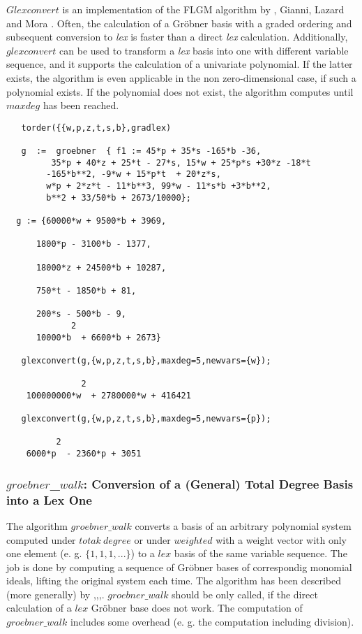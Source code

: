 $Glexconvert$ is an implementation of the FLGM algorithm by
, {\sc Gianni}, {\sc Lazard} and {\sc
Mora} \cite{Faugere:89}. Often, the calculation of a Gr\"obner basis
with a graded ordering and subsequent conversion to {\it lex} is
faster than a direct {\it lex} calculation. Additionally, $glexconvert$
can be used to transform a {\it lex} basis into one with different
variable sequence, and it supports the calculation of a univariate
polynomial. If the latter exists, the algorithm is even applicable in
the non zero-dimensional case, if such a polynomial exists.
If the polynomial does not exist, the algorithm computes  until $maxdeg$
has been reached.
\begin{verbatim}
   torder({{w,p,z,t,s,b},gradlex)

   g  :=  groebner  { f1 := 45*p + 35*s -165*b -36,
         35*p + 40*z + 25*t - 27*s, 15*w + 25*p*s +30*z -18*t
        -165*b**2, -9*w + 15*p*t  + 20*z*s,
        w*p + 2*z*t - 11*b**3, 99*w - 11*s*b +3*b**2,
        b**2 + 33/50*b + 2673/10000};

  g := {60000*w + 9500*b + 3969,

      1800*p - 3100*b - 1377,

      18000*z + 24500*b + 10287,

      750*t - 1850*b + 81,

      200*s - 500*b - 9,
             2
      10000*b  + 6600*b + 2673}

   glexconvert(g,{w,p,z,t,s,b},maxdeg=5,newvars={w});

               2
    100000000*w  + 2780000*w + 416421

   glexconvert(g,{w,p,z,t,s,b},maxdeg=5,newvars={p});

          2
    6000*p  - 2360*p + 3051

\end{verbatim}

\subsubsection{$groebner$\_$walk$: Conversion of a (General) Total Degree
Basis into a Lex One}
The algorithm $groebner\_walk$ converts a basis of an arbitrary polynomial
system computed under $totak\ degree$ or under $weighted$ with a weight
vector with only one element (e. g. $\{1,1,1,...\}$) to a $lex$ basis
of the same variable sequence. The job is done by computing a sequence
of Gr\"obner bases of correspondig monomial ideals, lifting the original
system each time. The algorithm has been described (more generally) by
\cite{AGK:961},\cite{AGK:962},\cite{AG:98},\cite{CKM:97}.
$groebner\_walk$ should be only called, if the direct calculation of a
$lex$ Gr\"obner base does not work. The computation of $groebner\_walk$
includes some overhead (e. g. the computation including division).

